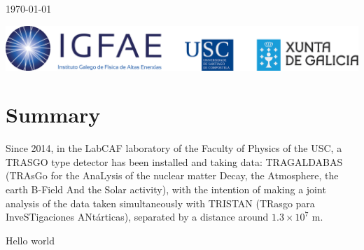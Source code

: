 \documentclass{book}
\begin{document}
\begin{titlepage}
	\vfill


	{\large \today\par}
\end{titlepage}


\thispagestyle{empty}
\vfill
\includegraphics[scale=0.25]{LogoIGFAE}


\tableofcontents

\chapter*{Summary}

\hspace{13pt} Since 2014, in the LabCAF laboratory of the Faculty of Physics of the USC, a TRASGO type detector has been installed and taking data: TRAGALDABAS (TRAsGo for the AnaLysis of the nuclear matter Decay, the Atmosphere, the earth B-Field And the Solar activity), with the intention of making a joint analysis of the data taken simultaneously with TRISTAN (TRasgo para InveSTigaciones ANtárticas), separated by a distance around $1.3 \times 10^7$ m.

Hello world
\end{document}
